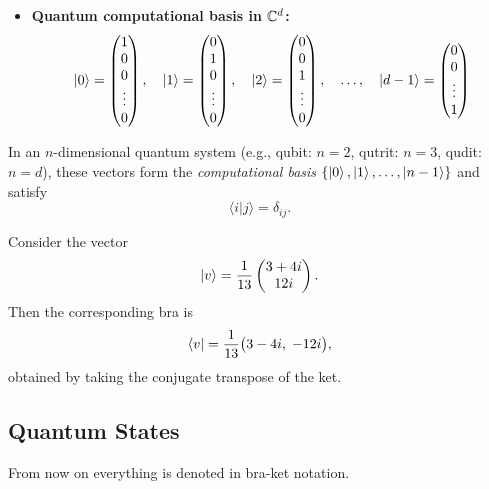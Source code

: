 \begin{example}
\begin{itemize}
    \item \textbf{Quantum computational basis in $\mathbb{C}^d$:}
    \[
        \ket{0} = \begin{pmatrix} 1 \\ 0 \\ 0 \\ \vdots \\ 0 \end{pmatrix},\quad
        \ket{1} = \begin{pmatrix} 0 \\ 1 \\ 0 \\ \vdots \\ 0 \end{pmatrix},\quad
        \ket{2} = \begin{pmatrix} 0 \\ 0 \\ 1 \\ \vdots \\ 0 \end{pmatrix},\quad
        \ldots,\quad
        \ket{d-1} = \begin{pmatrix} 0 \\ 0 \\ \vdots \\ 1 \end{pmatrix}
    \]
\end{itemize}

In an $n$-dimensional quantum system (e.g., qubit: $n=2$, qutrit: $n=3$, qudit: $n=d$), these vectors form the \emph{computational basis} $\{\ket{0},\ket{1},\ldots,\ket{n-1}\}$ and satisfy
\[
\langle i|j \rangle = \delta_{ij}.
\]
\end{example}

\begin{example}
Consider the vector
\[
\ket{v} = \frac{1}{13}
\begin{pmatrix}
3 + 4i \\
12i
\end{pmatrix}.
\]
Then the corresponding bra is
\[
\bra{v}
= \frac{1}{13}\big(3 - 4i,\; -12i\big),
\]
obtained by taking the conjugate transpose of the ket.
\end{example}

\subsection{Quantum States}

From now on everything is denoted in bra-ket notation.

